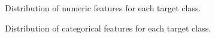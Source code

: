 \documentclass[
  letterpaper,
  DIV=11,
  numbers=noendperiod]{scrartcl}
\begin{document}
\begin{figure}


\caption{\label{fig-feature_density}Distribution of numeric features for
each target class.}

\end{figure}%

\begin{figure}


\caption{\label{fig-feature_bar_plot}Distribution of categorical
features for each target class.}

\end{figure}%
\end{document}
